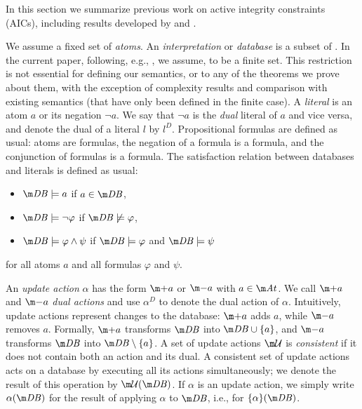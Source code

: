 In this section we summarize previous work on active integrity constraints (AICs), including results developed by \citet{ppdp/FlescaGZ04,iclp/CaropreseGSZ06,tplp/CaropreseT11} and \citet{tase/Cruz-FilipeGEN13}.

We assume a fixed set \atoms of \emph{atoms}. An \emph{interpretation} or \emph{database} is a subset of \atoms. 
In the current paper, following, e.g., \citet{tase/Cruz-FilipeGEN13}, we assume,  \atoms to be a finite set. 
This restriction is not essential for defining our semantics, or to any of the theorems we prove about them, with the exception of complexity results and comparison with existing semantics (that have only been defined in the finite case). 
A \emph{literal} is an atom $a$ or its negation $\lnot a$. 
We say that $\lnot a$ is the \emph{dual} literal of $a$ and vice versa, and denote the dual of a literal $l$ by $l^D$. 
Propositional formulas are defined as usual: atoms are formulas, the negation of a formula is a formula, and the conjunction of formulas is a formula. 
The satisfaction relation between databases \db and literals is defined as usual: 
\begin{itemize}
 \item $\db \models a$ if $a\in\db$,
 \item $\db \models \lnot \varphi$ if $\db\not\models \varphi$,
 \item $\db \models \varphi\land\psi$ if $\db\models \varphi$ and $\db \models \psi$
\end{itemize}
for all atoms $a$ and all formulas $\varphi$ and $\psi$.

An \emph{update action} $\alpha$ has the form $\add a$ or $\remove a$ with $a\in \atoms$. We call $\add a$ and $\remove a$ \emph{dual actions} and use $\alpha^D$ to denote the dual action of $\alpha$. 
Intuitively, update actions represent changes to the database: $\add a$ adds $a$, while $\remove a$ removes $a$. Formally, $\add a$ transforms $\db$ into $\db\cup\{a\}$, and $\remove a $ transforms $\db$ into $\db\setminus\{a\}$.
A set of update actions $\UU$ is \emph{consistent} if it does not contain both an action and its dual. A consistent set of update actions \UU acts on a database \db by executing all its actions simultaneously; we denote the result of this operation by $\UU(\db)$. If $\alpha$ is an update action, we simply write $\alpha(\db)$ for the result of applying $\alpha$ to $\db$, i.e.,  for $\{\alpha\}(\db)$.  

